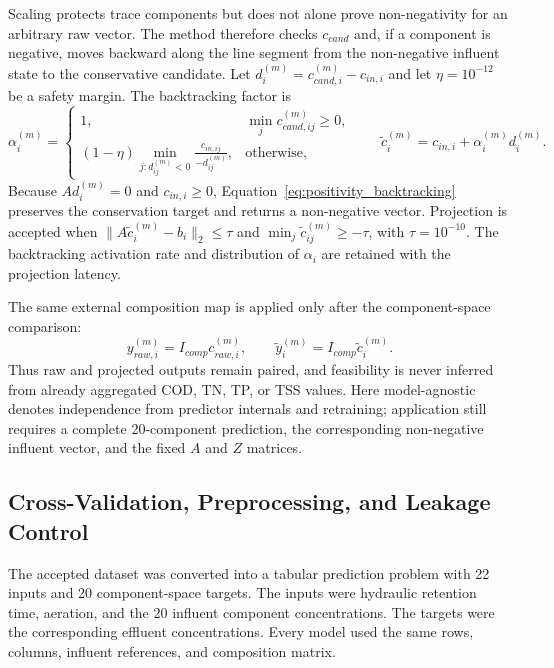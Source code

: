 \documentclass[a4paper,fleqn]{cas-sc}
\begin{document}
Scaling protects trace components but does not alone prove non-negativity for an arbitrary raw vector. The method therefore checks $c_{cand}$ and, if a component is negative, moves backward along the line segment from the non-negative influent state to the conservative candidate. Let $d_i^{(m)}=c_{cand,i}^{(m)}-c_{in,i}$ and let $\eta=10^{-12}$ be a safety margin. The backtracking factor is
\begin{equation}
\alpha_i^{(m)}=
\begin{cases}
1, & \min_j c_{cand,ij}^{(m)}\geq0,\\
(1-\eta)\displaystyle\min_{j:d_{ij}^{(m)}<0}
\frac{c_{in,ij}}{-d_{ij}^{(m)}}, & \text{otherwise},
\end{cases}
\qquad
\tilde c_i^{(m)}=c_{in,i}+\alpha_i^{(m)}d_i^{(m)}.
\label{eq:positivity_backtracking}
\end{equation}
Because $Ad_i^{(m)}=0$ and $c_{in,i}\geq0$, Equation~\eqref{eq:positivity_backtracking} preserves the conservation target and returns a non-negative vector. Projection is accepted when $\|A\tilde c_i^{(m)}-b_i\|_2\leq\tau$ and $\min_j\tilde c_{ij}^{(m)}\geq-\tau$, with $\tau=10^{-10}$. The backtracking activation rate and distribution of $\alpha_i$ are retained with the projection latency.

The same external composition map is applied only after the component-space comparison:
\begin{equation}
\label{eq:reported_composites}
y_{raw,i}^{(m)}=I_{comp}c_{raw,i}^{(m)},\qquad
\tilde y_i^{(m)}=I_{comp}\tilde c_i^{(m)}.
\end{equation}
Thus raw and projected outputs remain paired, and feasibility is never inferred from already aggregated COD, TN, TP, or TSS values. Here model-agnostic denotes independence from predictor internals and retraining; application still requires a complete 20-component prediction, the corresponding non-negative influent vector, and the fixed $A$ and $Z$ matrices.

\subsection{Cross-Validation, Preprocessing, and Leakage Control}

The accepted dataset was converted into a tabular prediction problem with 22 inputs and 20 component-space targets. The inputs were hydraulic retention time, aeration, and the 20 influent component concentrations. The targets were the corresponding effluent concentrations. Every model used the same rows, columns, influent references, and composition matrix.
\end{document}
